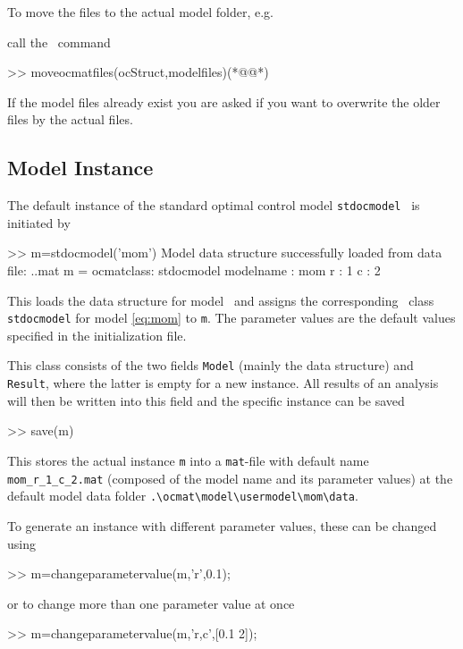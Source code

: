 To move the files to the actual model folder, e.g.
\begin{pathlisting}
\ocmat\model\usermodel\mom
\end{pathlisting}
call the \MATL\ command
\begin{matlab}
>> moveocmatfiles(ocStruct,modelfiles)(*@@*)
\end{matlab}
If the model files already exist you are asked if you want to overwrite the older files by the actual files.

\subsection{Model Instance}
\label{sec:modelinstance}
The default instance of the standard optimal control model \lstinline+stdocmodel+ \MoM\ is initiated by
\begin{matlab}
>> m=stdocmodel('mom')
Model data structure successfully loaded from data file:
.\ocmat\model\usermodel\mom\data\momModelDataStructure.mat
m =
ocmatclass: stdocmodel
    modelname : mom
    r : 1
    c : 2
\end{matlab}
This loads the data structure for model \MoM\ and assigns the corresponding \MATL\ class \lstinline+stdocmodel+ for model \cref{eq:mom} to \lstinline+m+. The parameter values are the default values specified in the initialization file.

This class consists of the two fields \lstinline+Model+ (mainly the data structure) and \lstinline+Result+, where the latter is empty for a new instance. All results of an analysis will then be written into this field and the specific instance can be saved
\begin{matlab}
>> save(m)
\end{matlab}
This stores the actual instance \lstinline+m+ into a \lstinline+mat+-file with default name \lstinline+mom_r_1_c_2.mat+ (composed of the model name and its parameter values) at the default model data folder \lstinline+.\ocmat\model\usermodel\mom\data+.

To generate an instance with different parameter values, these can be changed using
\begin{matlab}
>> m=changeparametervalue(m,'r',0.1);
\end{matlab}
or to change more than one parameter value at once
\begin{matlab}
>> m=changeparametervalue(m,'r,c',[0.1 2]);
\end{matlab}

